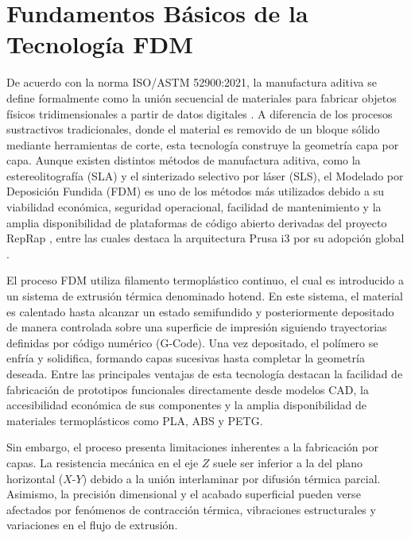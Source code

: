 \section{Fundamentos Básicos de la Tecnología FDM}
De acuerdo con la norma ISO/ASTM 52900:2021, la manufactura aditiva se define formalmente como la unión secuencial de materiales para fabricar objetos físicos tridimensionales a partir de datos digitales \cite{ISO52900}. A diferencia de los procesos sustractivos tradicionales, donde el material es removido de un bloque sólido mediante herramientas de corte, esta tecnología construye la geometría capa por capa. Aunque existen distintos métodos de manufactura aditiva, como la estereolitografía (SLA) y el sinterizado selectivo por láser (SLS), el Modelado por Deposición Fundida (FDM) es uno de los métodos más utilizados debido a su viabilidad económica, seguridad operacional, facilidad de mantenimiento y la amplia disponibilidad de plataformas de código abierto derivadas del proyecto RepRap \cite{jones2011reprap}, entre las cuales destaca la arquitectura Prusa i3 por su adopción global \cite{salazar2024}.

El proceso FDM utiliza filamento termoplástico continuo, el cual es introducido a un sistema de extrusión térmica denominado hotend. En este sistema, el material es calentado hasta alcanzar un estado semifundido y posteriormente depositado de manera controlada sobre una superficie de impresión siguiendo trayectorias definidas por código numérico (G-Code). Una vez depositado, el polímero se enfría y solidifica, formando capas sucesivas hasta completar la geometría deseada. Entre las principales ventajas de esta tecnología destacan la facilidad de fabricación de prototipos funcionales directamente desde modelos CAD, la accesibilidad económica de sus componentes y la amplia disponibilidad de materiales termoplásticos como PLA, ABS y PETG.

Sin embargo, el proceso presenta limitaciones inherentes a la fabricación por capas. La resistencia mecánica en el eje $Z$ suele ser inferior a la del plano horizontal ($X$-$Y$) debido a la unión interlaminar por difusión térmica parcial. Asimismo, la precisión dimensional y el acabado superficial pueden verse afectados por fenómenos de contracción térmica, vibraciones estructurales y variaciones en el flujo de extrusión.

